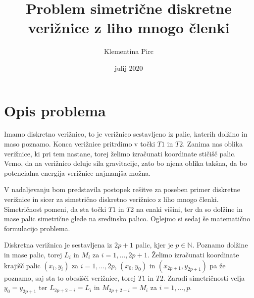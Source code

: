 \documentclass[A4paper, 11pt]{article}
\title{Problem simetrične diskretne verižnice z liho mnogo členki}
\author{Klementina Pirc}
\affil{Fakulteta za matematiko in fiziko \\ Oddelek za matematiko}
\date{julij 2020}
\begin{document}
\begin{titlepage} 

\maketitle
\thispagestyle{empty}
	
\end{titlepage}



\section{Opis problema}

Imamo diskretno verižnico, to je verižnico sestavljeno iz palic, katerih dolžino in maso poznamo. Konca verižnice pritrdimo v točki $T1$ in $T2$. Zanima nas oblika verižnice, ki pri tem nastane, torej želimo izračunati koordinate stičišč palic. Vemo, da na verižnico deluje sila gravitacije, zato bo njena oblika takšna, da bo potencialna energija verižnice najmanjša možna. 

V nadaljevanju bom predstavila postopek rešitve za poseben primer diskretne verižnice in sicer za simetrično diskretno verižnico z liho mnogo členki. Simetričnost pomeni, da sta točki $T1$ in $T2$ na enaki višini, ter da so dolžine in mase palic simetrične glede na sredinsko palico. Oglejmo si sedaj še matematično formulacijo problema.

Diskretna verižnica je sestavljena iz $2p+1$ palic, kjer je $p \in \mathbb{N}$. Poznamo dolžine in mase palic, torej $L_i$ in $M_i$ za $i=1, \ldots, 2p+1$. Želimo izračunati koordinate krajišč palic $(x_i,y_i)$ za $i=1, \ldots, 2p$, $(x_0,y_0)$ in $(x_{2p+1},y_{2p+1})$ pa že poznamo, saj sta to obesišči verižnice, torej $T1$ in $T2$. Zaradi simetričnosti velja $y_0 = y_{2p+1}$ ter $L_{2p+2-i} = L_i$ in $M_{2p+2-i} = M_i$ za $i=1, \ldots, p$.
\end{document}
